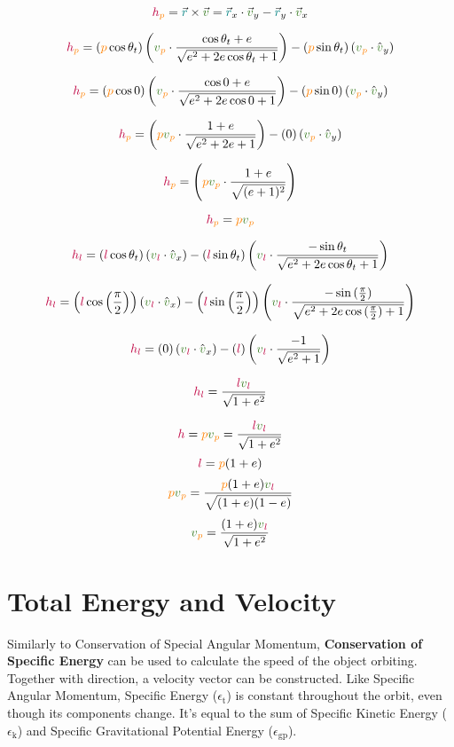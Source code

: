 $$\hv_{\peri}=\vec{\rad} \times \vec{\vel}=\vec{\rad}_x \cdot \vec{\vel}_y-\vec{\rad}_y \cdot \vec{\vel}_x$$
\begin{adjustwidth}{-4em}{-4em}
\begin{minipage}{\linewidth}
\begin{multicols}{2}
\raggedcolumns
\scriptsize
$$\hv_{\peri}=(\peri\cos{\true})\left(\vel_{\peri}\cdot\frac{\cos{\true}+\e}{\sqrt{\e^2+2\e\cos{\true}+1}}\right)-(\peri\sin{\true})\left(\vel_{\peri}\cdot\hat{\vel}_y\right)$$

$$\hv_{\peri}=(\peri\cos{0})\left(\vel_{\peri}\cdot\frac{\cos{0}+\e}{\sqrt{\e^2+2\e\cos{0}+1}}\right)-(\peri\sin{0})\left(\vel_{\peri}\cdot\hat{\vel}_y\right)$$

$$\hv_{\peri}=\left(\peri\vel_{\peri}\cdot\frac{1+\e}{\sqrt{\e^2+2\e+1}}\right)-(0)\left(\vel_{\peri}\cdot\hat{\vel}_y\right)$$

$$\hv_{\peri}=\left(\peri\vel_{\peri}\cdot\frac{1+\e}{\sqrt{(\e+1)^2}}\right)$$

$$\hv_{\peri}=\peri\vel_{\peri}$$
\columnbreak

$$\hv_{\latus}=\left(\latus\cos{\true}\right)\left(\vel_{\latus}\cdot\hat{\vel}_x\right)-\left(\latus\sin{\true}\right)\left(\vel_{\latus}\cdot\frac{-\sin{\true}}{\sqrt{\e^2+2\e\cos{\true}+1}}\right)$$

$$\hv_{\latus}=\left(\latus\cos{\left(\frac{\pi}{2}\right)}\right)\left(\vel_{\latus}\cdot\hat{\vel}_x\right)-\left(\latus\sin{\left(\frac{\pi}{2}\right)}\right)\left(\vel_{\latus}\cdot\frac{-\sin{(\frac{\pi}{2})}}{\sqrt{\e^2+2\e\cos{(\frac{\pi}{2})}+1}}\right)$$

$$\hv_{\latus}=(0)\left(\vel_{\latus}\cdot\hat{\vel}_x\right)-(\latus)\left(\vel_{\latus}\cdot\frac{-1}{\sqrt{\e^2+1}}\right)$$

$$\hv_{\latus}=\frac{\latus\vel_{\latus}}{\sqrt{1+\e^2}}$$
\columnbreak
\end{multicols}
\end{minipage}
\end{adjustwidth}
\scriptsize
$$\hv=\peri\vel_{\peri}=\frac{\latus\vel_{\latus}}{\sqrt{1+\e^2}}$$
$$\textcolor{purple}{l} = \textcolor{orange}{p}(1+\textcolor{black}{e})$$
$$\peri\vel_{\peri}=\frac{\peri(1+\e)\vel_{\latus}}{\sqrt{(1+\e)(1-\e)}}$$
$$\vel_{\peri}=\frac{(1+\e)\vel_{\latus}}{\sqrt{1+\e^2}}$$
\normalsize

\section{Total Energy and Velocity}
Similarly to Conservation of Special Angular Momentum, \textbf{Conservation of Specific Energy} can be used to calculate the speed of the object orbiting. Together with direction, a velocity vector can be constructed. Like Specific Angular Momentum, Specific Energy ($\epsilon_\text{t}$) is constant throughout the orbit, even though its components change. It's equal to the sum of Specific Kinetic Energy ($\epsilon_\text{k}$) and Specific Gravitational Potential Energy ($\epsilon_\text{gp}$).


